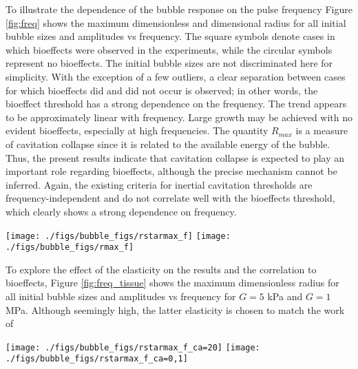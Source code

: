 To illustrate the dependence of the bubble response on the pulse
frequency Figure \ref{fig:freq} shows the maximum dimensionless and
dimensional radius for all initial bubble sizes and amplitudes vs
frequency. The square symbols denote cases in which bioeffects were
observed in the experiments, while the circular symbols represent no
bioeffects. The initial bubble sizes are not discriminated here for
simplicity. With the exception of a few outliers, a clear separation
between cases for which bioeffects did and did not occur is observed;
in other words, the bioeffect threshold has a strong dependence on the
frequency. The trend appears to be approximately linear with
frequency. Large growth may be achieved with no evident bioeffects,
especially at high frequencies. The quantity $R_{max}$ is a measure of
cavitation collapse since it is related to the available energy of the
bubble. Thus, the present results indicate that cavitation collapse is
expected to play an important role regarding bioeffects, although the
precise mechanism cannot be inferred. Again, the existing criteria for
inertial cavitation thresholds are frequency-independent and do not
correlate well with the bioeffects threshold, which clearly shows a
strong dependence on frequency.
\begin{figure*}%
  \texttt{[image: ./figs/bubble\_figs/rstarmax\_f]}  
  \texttt{[image: ./figs/bubble\_figs/rmax\_f]}      
  \caption[Dependence of the bubble dynamics on the ultrasound frequency]{ Dependence of the bubble dynamics on the frequency for
    $G=100$ kPa. $R_0=0.1-2$ $\mu$m; empty circles: no bioeffects; squares:
    bioeffects. (Left) Dimensionless (Left) and dimensional (Right) maximum bubble radius.}
  \label{fig:freq}
\end{figure*}

To explore the effect of the elasticity on the results and the
correlation to bioeffects, Figure \ref{fig:freq_tissue} shows the
maximum dimensionless radius for all initial bubble sizes and
amplitudes vs frequency for $G=5$ kPa and $G=1$ MPa. Although
seemingly high, the latter elasticity is chosen to match the work of
\begin{figure*}%
  \texttt{[image: ./figs/bubble\_figs/rstarmax\_f\_ca=20]}
  \texttt{[image: ./figs/bubble\_figs/rstarmax\_f\_ca=0,1]}    
  \caption[Dependence of the dimensionless maximum bubble radius on
    the ultrasound frequency]{ Dependence of the dimensionless maximum bubble radius on
    the frequency for $G=5$ kPa (Left) and $G=1$ MPa (Right). $R_0=0.1-2$ $\mu$m; empty circles: no bioeffects; squares:
    bioeffects. }
  \label{fig:freq_tissue}
\end{figure*}

